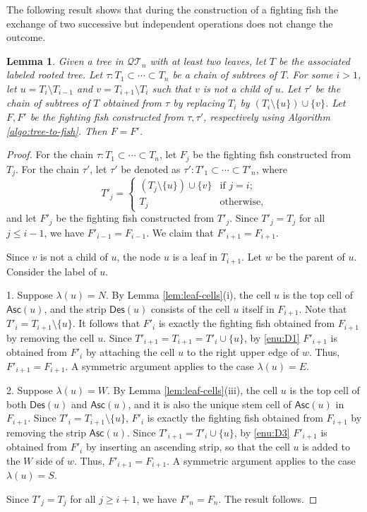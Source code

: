 \documentclass[a4paper,11pt,reqno]{amsart}
\newtheorem{lem}{Lemma}[section]
\theoremstyle{definition}
\numberwithin{equation}{section}
\newcommand{\Des}{{\textsf{Des}}}
\newcommand{\Asc}{{\textsf{Asc}}}
\newcommand{\QT}{{\mathcal{QT}}}
\begin{document}
The following result shows that during the construction of a fighting fish the exchange of two successive but independent operations does not change the outcome.

\begin{lem} \label{lem:exchange-operation} 
Given a tree in $\QT_n$ with at least two leaves, let $T$ be the associated labeled rooted tree.  Let $\tau:T_1\subset \cdots\subset T_n$ be a chain of subtrees of $T$. For some $i>1$, let $u=T_i\setminus T_{i-1}$ and $v = T_{i+1}\setminus T_i$ such that $v$ is not a child of $u$. Let $\tau'$ be the chain of subtrees of $T$ obtained from $\tau$ by replacing $T_i$ by $(T_i\setminus\{u\})\cup\{v\}$. Let $F, F'$ be the fighting fish constructed from $\tau,\tau'$, respectively using Algorithm \ref{algo:tree-to-fish}. Then $F=F'$.
\end{lem}

\begin{proof}
For the chain $\tau:T_1\subset\cdots\subset T_n$, let $F_j$ be the fighting fish constructed from $T_j$. For the chain $\tau'$, let $\tau'$ be denoted as $\tau':T'_1\subset\cdots\subset T'_n$, where
\begin{equation}
T'_j = \begin{cases}
(T_j\setminus\{u\})\cup\{v\} & \mbox{if $j=i$;} \\
T_j & \mbox{otherwise,}
\end{cases}
\end{equation}
and let $F'_j$ be the fighting fish constructed from $T'_j$. Since $T'_j=T_j$ for all $j\le i-1$, we have $F'_{i-1}=F_{i-1}$.  We claim that $F'_{i+1}=F_{i+1}$.


Since $v$ is not a child of $u$, the node $u$ is a leaf in $T_{i+1}$. Let $w$ be the parent of $u$. Consider the label of $u$.

1. Suppose $\lambda(u)=N$. By Lemma \ref{lem:leaf-cells}(i), the cell $u$ is the top cell of $\Asc(u)$, and the strip $\Des(u)$ consists of the cell $u$ itself in $F_{i+1}$. Note that $T'_i=T_{i+1}\setminus\{u\}$. It follows that $F'_i$ is exactly the fighting fish obtained from $F_{i+1}$ by removing the cell $u$. Since $T'_{i+1}=T_{i+1}=T'_i\cup\{u\}$, by \ref{enu:D1} $F'_{i+1}$ is obtained from $F'_i$ by attaching the cell $u$ to the right upper edge of $w$. Thus, $F'_{i+1}=F_{i+1}$. A symmetric argument applies to the case $\lambda(u)=E$.

2. Suppose $\lambda(u)=W$. By Lemma \ref{lem:leaf-cells}(iii), the cell $u$ is the top cell of both $\Des(u)$ and $\Asc(u)$, and it is also the unique stem cell of $\Asc(u)$ in $F_{i+1}$. Since $T'_i=T_{i+1}\setminus\{u\}$, $F'_i$ is exactly the fighting fish obtained from $F_{i+1}$ by removing the strip $\Asc(u)$. Since $T'_{i+1}=T'_i\cup\{u\}$, by \ref{enu:D3} $F'_{i+1}$ is obtained from $F'_i$ by inserting an ascending strip, so that the cell $u$ is added to the $W$ side of $w$. Thus, $F'_{i+1}=F_{i+1}$. A symmetric argument applies to the case $\lambda(u)=S$.

Since $T'_j=T_j$ for all $j\ge i+1$, we have $F'_n=F_n$. The result follows.
\end{proof}
\end{document}
